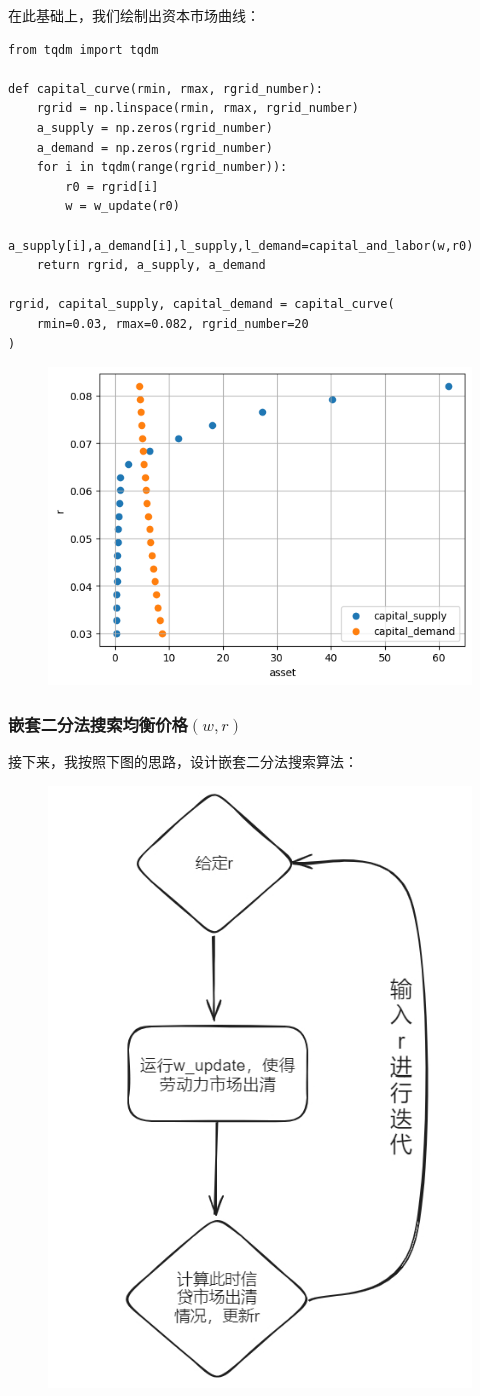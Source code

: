\documentclass[a4paper, 12pt]{ctexart}
\begin{document}
在此基础上，我们绘制出资本市场曲线：
\begin{lstlisting}
from tqdm import tqdm

def capital_curve(rmin, rmax, rgrid_number):
    rgrid = np.linspace(rmin, rmax, rgrid_number)
    a_supply = np.zeros(rgrid_number)
    a_demand = np.zeros(rgrid_number)
    for i in tqdm(range(rgrid_number)):
        r0 = rgrid[i]
        w = w_update(r0)
        a_supply[i],a_demand[i],l_supply,l_demand=capital_and_labor(w,r0)
    return rgrid, a_supply, a_demand

rgrid, capital_supply, capital_demand = capital_curve(
    rmin=0.03, rmax=0.082, rgrid_number=20
)
\end{lstlisting}
\begin{figure}[h]
    \centering
    \includegraphics[width=0.8\linewidth]{pic/9.png}
    \nonumber
    \label{fig:enter-label}
\end{figure}

\newpage

\subsubsection{嵌套二分法搜索均衡价格$(w,r)$}
接下来，我按照下图的思路，设计嵌套二分法搜索算法：

\begin{figure}[ht]
    \centering
    \includegraphics[width=0.35\linewidth]{pic/algor4.png}
    \nonumber
    \label{fig:enter-label}
\end{figure}
\end{document}
